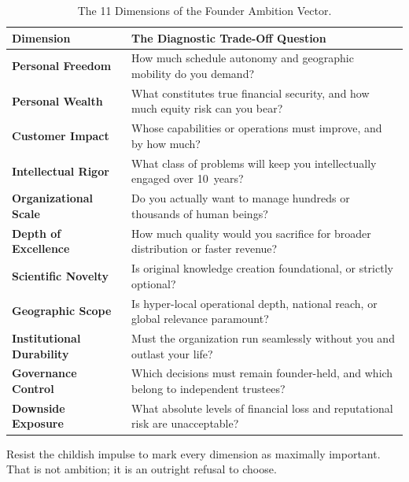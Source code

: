 \begin{table}[htbp]
\centering
\begin{tcolorbox}[
  enhanced,
  colback=white,
  colframe=BayesBorder!80!white,
  boxrule=0.4pt,
  arc=2pt,
  left=3pt,right=3pt,top=3pt,bottom=3pt,
  before skip=3pt,after skip=4pt
]
\scriptsize
\setlength{\tabcolsep}{3pt}
\renewcommand{\arraystretch}{1.18}
\begin{tabularx}{\linewidth}{@{} >{\bfseries\color{BayesInk}}p{2.3cm} >{\color{BayesInk}}X @{}}
\toprule
\textbf{Dimension} & \textbf{The Diagnostic Trade-Off Question} \\
\midrule
Personal Freedom & How much schedule autonomy and geographic mobility do you demand? \\
Personal Wealth & What constitutes true financial security, and how much equity risk can you bear? \\
Customer Impact & Whose capabilities or operations must improve, and by how much? \\
Intellectual Rigor & What class of problems will keep you intellectually engaged over 10~years? \\
Organizational Scale & Do you actually want to manage hundreds or thousands of human beings? \\
Depth of Excellence & How much quality would you sacrifice for broader distribution or faster revenue? \\
Scientific Novelty & Is original knowledge creation foundational, or strictly optional? \\
Geographic Scope & Is hyper-local operational depth, national reach, or global relevance paramount? \\
Institutional Durability & Must the organization run seamlessly without you and outlast your life? \\
Governance Control & Which decisions must remain founder-held, and which belong to independent trustees? \\
Downside Exposure & What absolute levels of financial loss and reputational risk are unacceptable? \\
\bottomrule
\end{tabularx}
\end{tcolorbox}
\caption{The 11 Dimensions of the Founder Ambition Vector.}
\label{tab:ambition-vector}
\end{table}

Resist the childish impulse to mark every dimension as maximally important. That is not ambition; it is an outright refusal to choose.

